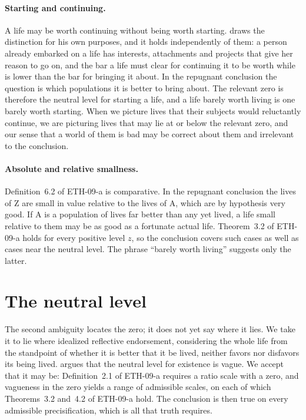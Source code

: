 \documentclass{situationist-preprint}
\begin{document}
\paragraph{Starting and continuing.} A life may be worth continuing without being worth starting. \citet[ch.~2]{Benatar2006} draws the distinction for his own purposes, and it holds independently of them: a person already embarked on a life has interests, attachments and projects that give her reason to go on, and the bar a life must clear for continuing it to be worth while is lower than the bar for bringing it about. In the repugnant conclusion the question is which populations it is better to bring about. The relevant zero is therefore the neutral level for starting a life, and a life barely worth living is one barely worth starting. When we picture lives that their subjects would reluctantly continue, we are picturing lives that may lie at or below the relevant zero, and our sense that a world of them is bad may be correct about them and irrelevant to the conclusion.

\paragraph{Absolute and relative smallness.} Definition~6.2 of ETH-09-a is comparative. In the repugnant conclusion the lives of Z are small in value relative to the lives of A, which are by hypothesis very good. If A is a population of lives far better than any yet lived, a life small relative to them may be as good as a fortunate actual life. Theorem~3.2 of ETH-09-a holds for every positive level $z$, so the conclusion covers such cases as well as cases near the neutral level. The phrase \enquote{barely worth living} suggests only the latter.

\section{The neutral level}

The second ambiguity locates the zero; it does not yet say where it lies. We take it to lie where idealized reflective endorsement, considering the whole life from the standpoint of whether it is better that it be lived, neither favors nor disfavors its being lived. \citet{Broome2004} argues that the neutral level for existence is vague. We accept that it may be: Definition~2.1 of ETH-09-a requires a ratio scale with a zero, and vagueness in the zero yields a range of admissible scales, on each of which Theorems~3.2 and~4.2 of ETH-09-a hold. The conclusion is then true on every admissible precisification, which is all that truth requires.
\end{document}
